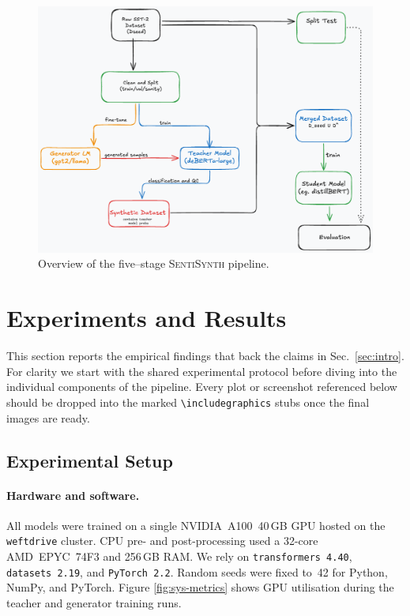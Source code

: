 \documentclass[11pt]{article}
\begin{document}
\begin{figure}[t]
  \centering
  \includegraphics[width=.95\linewidth]{./figures/pipeline.png}
  \caption{Overview of the five--stage \textsc{SentiSynth} pipeline.}
  \label{fig:pipeline}
\end{figure}

\section{Experiments and Results}
\label{sec:experiments}

This section reports the empirical findings that back the claims in
Sec.~\ref{sec:intro}.  For clarity we start with the shared experimental
protocol before diving into the individual components of the pipeline.
Every plot or screenshot referenced below should be dropped into the
marked \verb|\includegraphics| stubs once the final images are ready.

\subsection{Experimental Setup}
\label{sec:exp-setup}

\paragraph{Hardware and software.}
All models were trained on a single NVIDIA~A100~40\,GB GPU hosted on the
\texttt{weftdrive} cluster.  CPU pre- and post-processing used a
32-core AMD~EPYC~74F3 and 256\,GB RAM.  We rely on
\texttt{transformers~4.40}, \texttt{datasets~2.19}, and
\texttt{PyTorch~2.2}.  Random seeds were fixed to~42 for Python,
NumPy, and PyTorch. Figure \ref{fig:sys-metrics} shows GPU utilisation
during the teacher and generator training runs.
\end{document}
